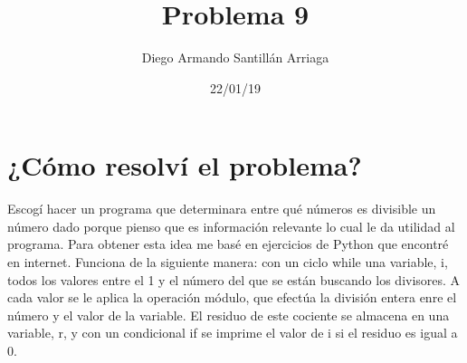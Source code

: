 \documentclass[letterpaper, 12pt, oneside]{article}%
\title{\Huge Problema 9}
\author{Diego Armando Santillán Arriaga}
\date{22/01/19}
\begin{document}
\maketitle
\newpage
\section*{¿Cómo resolví el problema?}
Escogí hacer un programa que determinara entre qué números es divisible un número dado porque pienso que es información relevante lo cual le da utilidad al programa. Para obtener esta idea me basé en ejercicios de Python que encontré en internet. Funciona de la siguiente manera: con un ciclo while una variable, i,  todos los valores entre el 1 y el número del que se están buscando los divisores. A cada valor se le aplica la operación módulo, que efectúa la división entera enre el número y el valor de la variable. El residuo de este cociente se almacena en una variable, r, y con un condicional if se imprime el valor de i si el residuo es igual a 0. 

  
\end{document}
